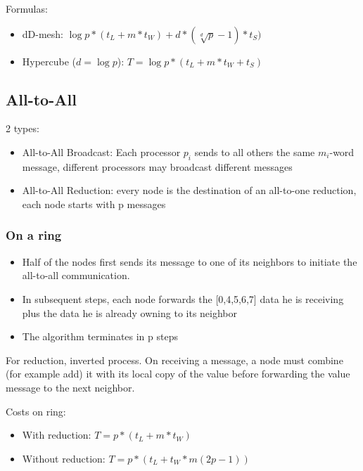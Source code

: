 \documentclass[11pt,a4paper]{report}
\begin{document}
Formulas: 
\begin{itemize}
    \item dD-mesh:
    $ \log{p}*(t_{L} + m * t_{W}) + d * (\sqrt[d]{p}-1) * t_{S})$
    
    \item Hypercube ($d=\log{p}$):
    $T = \log{p} * (t_{L} + m * t_{W} + t_{S})$
\end{itemize}


\subsection{All-to-All}

2 types:

\begin{itemize}
    \item All-to-All Broadcast: Each processor $p_{i}$ sends to all others the 
    same $m_{i}$-word message, different processors may broadcast different 
    messages
    \item All-to-All Reduction: every node is the destination of 
an all-to-one reduction, each node starts with p messages
\end{itemize}

\subsubsection{On a ring}

\begin{itemize}
    \item Half of the nodes first sends its message to one of its neighbors to 
    initiate the all-to-all communication.
    
    \item In subsequent steps, each node forwards the [0,4,5,6,7] data he is 
    receiving plus the data he is already owning to its neighbor
    
    \item The algorithm terminates in p steps
\end{itemize}

For reduction, inverted process. On receiving a message, a node must combine  
(for example add) it with its local copy of the value before forwarding the 
value message to the next neighbor.

Costs on ring:

\begin{itemize}
    \item With reduction:
    $T = p*(t_{L} + m*t_{W})$
    
    \item Without reduction:
    $T = p * (t_{L} + t_{W} * m (2p-1))$
\end{itemize}
\end{document}
